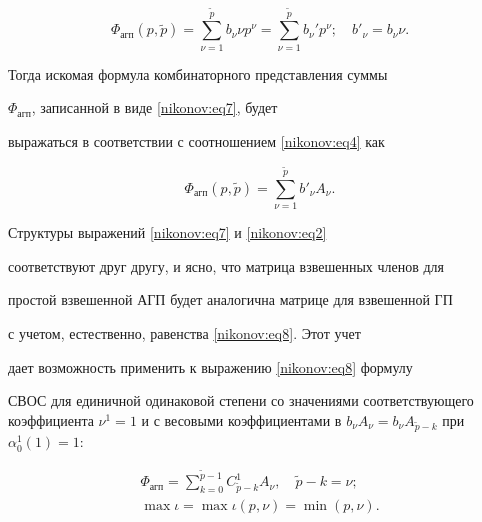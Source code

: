 \begin{equation}

\label{nikonov:eq7}

\Phi_{\text{агп}} (p,\tilde{p})=\sum\limits_{\nu=1}^{\tilde{p}} b_\nu \nu p^\nu=\sum \limits_{\nu=1}^{\tilde{p}} b_\nu' p^{\nu}; \quad b'_\nu =b_\nu \nu.

\end{equation}



Тогда искомая формула комбинаторного представления суммы

$\Phi_{\text{агп}}$, записанной в виде \eqref{nikonov:eq7}, будет

выражаться в соответствии с соотношением \eqref{nikonov:eq4} как

\begin{equation}

\label{nikonov:eq8}

\Phi_{\text{агп}}(p,\tilde{p})=\sum \limits_{\nu=1}^{\tilde{p}} b'_\nu A_\nu.

\end{equation}



Структуры выражений \eqref{nikonov:eq7} и \eqref{nikonov:eq2}

соответствуют друг другу, и ясно, что матрица взвешенных членов для

простой взвешенной АГП будет аналогична матрице для взвешенной ГП

с учетом, естественно, равенства \eqref{nikonov:eq8}. Этот учет

дает возможность применить к выражению \eqref{nikonov:eq8} формулу

СВОС для единичной одинаковой степени со значениями соответствующего коэффициента $\nu^1=1$ и с весовыми коэффициентами в $b_\nu A_\nu=b_\nu A_{\tilde{p}-k}$ при $\alpha_0^1(1)=1$:

\begin{gather}

\label{nikonov:eq9}

\Phi_{\text{агп}}=\sum \limits_{k=0}^{\tilde{p}-1}

C^1_{\tilde{p}-k} A_\nu, \quad \tilde{p}-k=\nu;\\

\label{nikonov:eq10}

\max \iota= \max \iota(p,\nu)=\min(p,\nu).

\end{gather}



